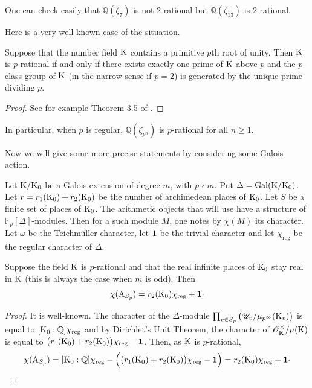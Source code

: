 \documentclass[12pt,a4paper,twoside,english]{smfart}
\def\K{{\rm K}}
\def\Q{{\mathbb Q}}
\def\fq{{\mathbb F}}
\def\O{{\mathcal O}}
\def\U{{\mathcal U}}
\def\Gal{{\rm Gal}}
\def\A{{\rm A}}
\def\1{{\bf 1}}
\begin{document}
\begin{exem}\label{exemple-p=2}
One can check easily that $\Q(\zeta_7)$ is not $2$-rational but $\Q(\zeta_{13})$ is $2$-rational.
\end{exem}



 Here is a very well-known case of the situation. 
 
 
 \begin{prop} \label{p-rational}
 Suppose that the number field $\K$ contains a primitive $p$th root of unity. 
 Then $\K$ is $p$-rational if and only if
 there exists exactly one prime of $\K$ above $p$ and the $p$-class group of $\K$ (in the narrow sense if $p=2$) is generated 
 by  the unique prime dividing $p$.
\end{prop}

\begin{proof}
 See for example Theorem 3.5 of \cite{gras}.
 \end{proof}

\begin{rema}
In particular, when $p$ is regular, $\Q(\zeta_{p^n})$ is $p$-rational for all $n\geq 1$.
\end{rema}

Now we will give some more precise statements by considering some  Galois action.

Let $\K/\K_0$ be a Galois extension of degree $m$, with $p \nmid m$. Put  $\Delta=\Gal(\K/\K_0)$.
Let $r=r_1(\K_0)+r_2(\K_0)$ be the number of archimedean places of $\K_0$.
Let $S$ be a finite set of places of $\K_0$.
The arithmetic objects that will use have a structure  of $\fq_p[\Delta]$-modules. Then for a such module $M$,
one notes by  $\chi(M)$ its character. Let $\omega$ be the Teichm\"uller character, let  $\1$ be the trivial character and let $\chi_{\mathrm{reg}}$ be the regular character of $\Delta$.

\begin{prop}\label{action}
Suppose the field $\K$ is $p$-rational and that the real infinite places of $\K_0$ stay real in $\K$ (this is always the case when $m$ is odd). Then $$\chi(\A_{S_p})=r_2(\K_0) \chi_{\mathrm{reg}} + \1\cdot$$
\end{prop}

\begin{proof} It is well-known. The character of the $\Delta$-module   $\prod_{v\in S_p}\big(\U_v/\mu_{p^\infty}(\K_v)\big)$ is equal to $[\K_0:\Q]\chi_{\mathrm{reg}}$ and by Dirichlet's Unit Theorem, the character of $\O_\K^\times/\mu(\K)$ is equal to $\displaystyle{\big(r_1(\K_0)+r_2(\K_0)\big) \chi_{\mathrm{reg}} - \1}$. Then, as $\K$ is $p$-rational, 
$$\chi(\A_{S_p})= [\K_0:\Q]\chi_{\mathrm{reg}} - \Big(\big(r_1(\K_0)+r_2(\K_0)\big) \chi_{\mathrm{reg}} - \1\Big)=r_2(\K_0) \chi_{\mathrm{reg}} + \1\cdot$$
\end{proof}
\end{document}
